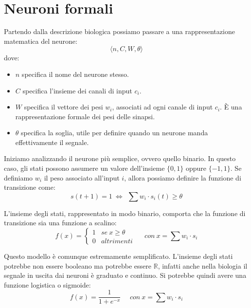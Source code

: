 \section{Neuroni formali}
Partendo dalla descrizione biologica possiamo passare a una rappresentazione matematica del neurone:
\begin{equation}
    \langle n, C, W, \theta \rangle
\end{equation}
dove:
\begin{itemize}
    \item $n$ specifica il nome del neurone stesso.
    \item $C$ specifica l'insieme dei canali di input $c_i$.
    \item $W$ specifica il vettore dei pesi $w_i$, associati ad ogni canale di input $c_i$. È una rappresentazione formale dei pesi delle sinapsi.
    \item $\theta$ specifica la soglia, utile per definire quando un neurone manda effettivamente il segnale.
\end{itemize}

Iniziamo analizzando il neurone più semplice, ovvero quello binario. In questo caso, gli stati possono assumere un valore dell'insieme $\{0, 1\}$ oppure $\{-1, 1\}$. Se definiamo $w_i$ il peso associato all'input $i$, allora possiamo definire la funzione di transizione come:
\begin{equation}
    s(t + 1) = 1 \ \iff \ \ \sum w_i \cdot s_i(t) \geq \theta
\end{equation}

L’insieme degli stati, rappresentato in modo binario, comporta che la funzione di transizione sia una funzione a scalino:
\begin{equation}
    f(x) = \begin{cases}
    1 & se \ x \geq \theta \\
    0 & altrimenti
\end{cases} \ \ \ \ \ \ con \ x = \sum w_i \cdot s_i
\end{equation}

Questo modello è comunque estremamente semplificato. L'insieme degli stati potrebbe non essere booleano ma potrebbe essere $\mathbb{R}$, infatti anche nella biologia il segnale in uscita dai neuroni è graduato e continuo. Si potrebbe quindi avere una funzione logistica o sigmoide:
\begin{equation}
    f(x) = \frac{1}{1 + e^{-x}} \ \ \ \ \ \ con \ x = \sum w_i \cdot s_i
\end{equation}
